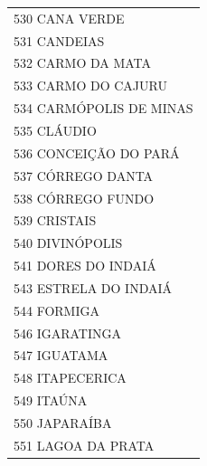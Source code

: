 \documentclass{article}
\begin{document}
\begin{longtable}[c]{m{18cm}}
\multicolumn{1}{l}{ \hspace{2em} 530 CANA VERDE } \\
\multicolumn{1}{l}{ \hspace{2em} 531 CANDEIAS } \\
\multicolumn{1}{l}{ \hspace{2em} 532 CARMO DA MATA } \\
\multicolumn{1}{l}{ \hspace{2em} 533 CARMO DO CAJURU } \\
\multicolumn{1}{l}{ \hspace{2em} 534 CARMÓPOLIS DE MINAS } \\
\multicolumn{1}{l}{ \hspace{2em} 535 CLÁUDIO } \\
\multicolumn{1}{l}{ \hspace{2em} 536 CONCEIÇÃO DO PARÁ } \\
\multicolumn{1}{l}{ \hspace{2em} 537 CÓRREGO DANTA } \\
\multicolumn{1}{l}{ \hspace{2em} 538 CÓRREGO FUNDO } \\
\multicolumn{1}{l}{ \hspace{2em} 539 CRISTAIS } \\
\multicolumn{1}{l}{ \hspace{2em} 540 DIVINÓPOLIS } \\
\multicolumn{1}{l}{ \hspace{2em} 541 DORES DO INDAIÁ } \\
\multicolumn{1}{l}{ \hspace{2em} 543 ESTRELA DO INDAIÁ } \\
\multicolumn{1}{l}{ \hspace{2em} 544 FORMIGA } \\
\multicolumn{1}{l}{ \hspace{2em} 546 IGARATINGA } \\
\multicolumn{1}{l}{ \hspace{2em} 547 IGUATAMA } \\
\multicolumn{1}{l}{ \hspace{2em} 548 ITAPECERICA } \\
\multicolumn{1}{l}{ \hspace{2em} 549 ITAÚNA } \\
\multicolumn{1}{l}{ \hspace{2em} 550 JAPARAÍBA } \\
\multicolumn{1}{l}{ \hspace{2em} 551 LAGOA DA PRATA } \\

\end{longtable}
\end{document}
